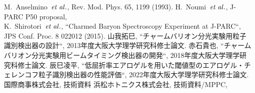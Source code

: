 \begin{thebibliography}{99}
   M.~Anselmino~${\it et\;al.}$, Rev. Mod. Phys. 65, 1199 (1993).
   H.~Noumi~${\it et\;al.}$, J-PARC P50 proposal, \\
   K.~Shirotori~${\it et\;al.}$, ``Charmed Baryon Spectroscopy Experiment at J-PARC``, JPS Conf. Proc. 8 022012 (2015).
   山我拓巳, ``チャームバリオン分光実験用粒子識別検出器の設計``, 2013年度大阪大学理学研究科修士論文.
   赤石貴也, ``チャームバリオン分光実験用ビームタイミング検出器の開発``, 2018年度大阪大学理学研究科修士論文.
   辰巳凌平, ``低屈折率エアロゲルを用いた閾値型のエアロゲル・チェレンコフ粒子識別検出器の性能評価``, 2022年度大阪大学理学研究科修士論文.
   国際商事株式会社, 技術資料
   浜松ホトニクス株式会社, 技術資料/MPPC,








\end{thebibliography}
